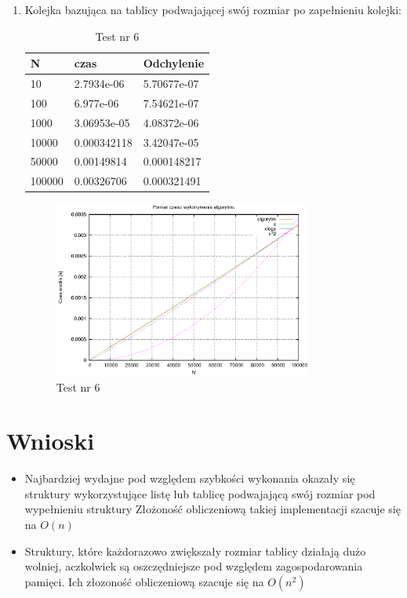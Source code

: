 \documentclass[a4paper,11pt]{article}
\begin{document}
\begin{enumerate}
\item Kolejka bazująca na tablicy podwajającej swój rozmiar po zapełnieniu kolejki:

\begin{table}[th]
    \caption{Test nr 6}

      \begin{tabular}{l|l|l}
	\hline
	N & czas & Odchylenie\\
    \hline
    10 & 2.7934e-06 & 5.70677e-07\\
    \hline
100 & 6.977e-06 & 7.54621e-07\\
\hline
1000 & 3.06953e-05 & 4.08372e-06\\
\hline
10000 & 0.000342118 & 3.42047e-05\\
\hline
50000 & 0.00149814 & 0.000148217\\
\hline
100000 & 0.00326706 & 0.000321491\\

\hline
    \end{tabular}
    \end{table}
    \newpage
\begin{figure}[th]
\centering
\includegraphics[width=0.8\textwidth]{wykres6.eps}
\caption{Test nr 6}
\label{Test nr 6}
\end{figure} 
\end{enumerate}

\section{Wnioski}

\begin{itemize}
\item Najbardziej wydajne pod względem szybkości wykonania okazały się struktury wykorzystujące listę lub tablicę podwajającą swój rozmiar pod wypełnieniu struktury
Złożoność obliczeniową takiej implementacji szacuje się na $ O(n) $
\item Struktury, które każdorazowo zwiększały rozmiar tablicy działają dużo wolniej, aczkolwiek są oszczędniejsze pod względem zagospodarowania pamięci.
Ich złozoność obliczeniową szacuje się na $ O(n^{2}) $
\end{itemize}
\end{document}
